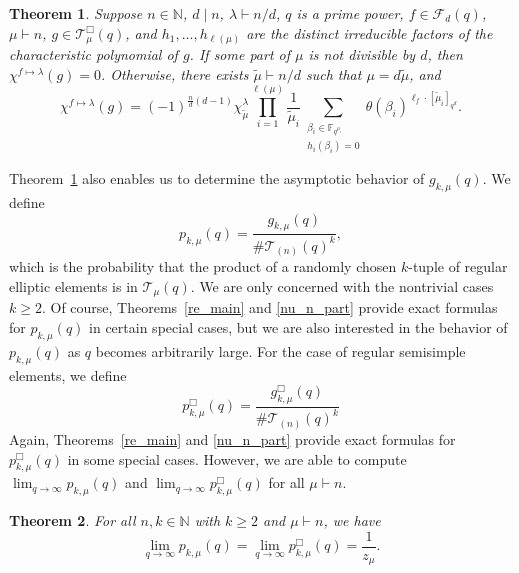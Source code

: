 \documentclass[10pt]{article}
\newtheorem{theorem}{Theorem}[section]
\theoremstyle{definition}
\newcommand{\F}{\mathbb{F}}
\newcommand{\CF}{\mathcal{F}}
\newcommand{\N}{\mathbb{N}}
\newcommand{\CT}{\mathcal{T}}
\newcommand{\te}{\theta}
\begin{document}
\begin{theorem} \label{main_lemma_in_intro}
Suppose \(n \in \N\), \(d \mid n\), \(\lambda \vdash n/d\), \(q\) is a prime power, \(f \in \CF_d (q)\), \(\mu \vdash n\), \(g \in \CT_\mu^\Box (q)\), and \(h_1,\ldots,h_{\ell(\mu)}\) are the distinct irreducible factors of the characteristic polynomial of \(g\).
If some part of \(\mu\) is not divisible by \(d\), then \(\chi^{f \mapsto \lambda} (g) = 0\).
Otherwise, there exists \(\tilde{\mu} \vdash n/d\) such that \(\mu = d \tilde{\mu}\), and
\begin{equation}
\chi^{f \mapsto \lambda} (g)
= (-1)^{\tfrac{n}{d}(d-1)}
\chi^\lambda_{\tilde{\mu}}
\prod_{i = 1}^{\ell(\mu)}
\frac{1}{\tilde{\mu}_i}
\sum_{\substack{ \beta_i \in \F_{q^{\mu_i}} \\ h_i(\beta_i) = 0}} \te (\beta_i)^{\ell_f \cdot [\tilde{\mu}_i]_{q^d}}.
\end{equation}
\end{theorem}




Theorem~\ref{main_lemma_in_intro} also enables us to determine the asymptotic behavior of \(g_{k,\mu} (q)\).
We define
\begin{equation}
p_{k,\mu} (q) = \frac{g_{k,\mu}(q)}{\# \CT_{(n)} (q)^k},
\end{equation}
which is the probability that the product of a randomly chosen \(k\)-tuple of regular elliptic elements is in \(\CT_\mu (q)\).
We are only concerned with the nontrivial cases \(k \geq 2\).
Of course, Theorems~\ref{re_main} and \ref{nu_n_part} provide exact formulas for \(p_{k,\mu} (q)\) in certain special cases, but we are also interested in the behavior of \(p_{k,\mu}(q)\) as \(q\) becomes arbitrarily large.
For the case of regular semisimple elements,
we define
\begin{equation}
\label{pBox_defs}
p_{k,\mu}^\Box (q) = \frac{g_{k,\mu}^\Box(q)}{\# \CT_{(n)} (q)^k}
\end{equation}
Again, Theorems~\ref{re_main} and \ref{nu_n_part} provide exact formulas for \(p^\Box_{k,\mu} (q)\) in some special cases.
However, we are able to compute \(\lim_{q \to \infty} p_{k,\mu} (q)\) and \(\lim_{q \to \infty} p_{k,\mu}^\Box (q)\) for all \(\mu \vdash n\).

\begin{theorem}
\label{intro_version_p}
For all \(n,k \in \N\) with \(k \geq 2\) and \(\mu \vdash n\), we have
\begin{equation}
\lim_{q \to \infty} p_{k,\mu}      (q) =
\lim_{q \to \infty} p_{k,\mu}^\Box (q) =
\frac{1}{z_\mu}.
\end{equation}
\end{theorem}
\end{document}
